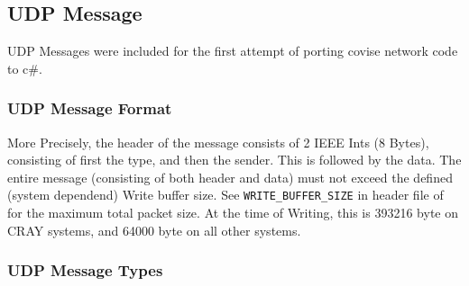 \begin{messagetypes}
\end{messagetypes}

\subsection{UDP Message}

UDP Messages were included for the first attempt of porting covise network code to c\#.

\subsubsection{UDP Message Format}

\begin{messagedesc}
\end{messagedesc}

More Precisely, the header of the message consists of 2 IEEE Ints (8 Bytes), consisting of first the type, and then the sender. This is followed by the data. The entire message (consisting of both header and data) must not exceed the defined (system dependend) Write buffer size. See \lstinline|WRITE_BUFFER_SIZE| in header file of  for the maximum total packet size. At the time of Writing, this is 393216 byte on CRAY systems, and 64000 byte on all other systems.

\subsubsection{UDP Message Types}

\begin{messagetypes}
\end{messagetypes}

